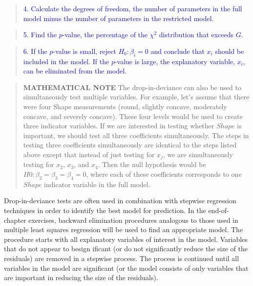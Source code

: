 \documentclass[
]{book}
\begin{document}
\begin{quote}
\textcolor{blue}{4. Calculate the degrees of freedom, the number of parameters in the full model minus the number of parameters in the restricted model.}
\end{quote}

\begin{quote}
\textcolor{blue}{5. Find the $p$-value, the percentage of the $\chi^2$ distribution that exceeds $G$.}
\end{quote}

\begin{quote}
\textcolor{blue}{6. If the $p$-value is small, reject $H_0: \beta_i = 0$ and conclude that $x_i$ should be included in the model. If the $p$-value is large, the explanatory variable, $x_i$, can be eliminated from the model.}
\end{quote}

\begin{quote}
\textbf{MATHEMATICAL NOTE}
The drop-in-deviance can also be used to simultaneously test multiple variables. For example, let's assume that there were four Shape measurements (round, slightly concave, moderately concave, and severely concave). These four levels would be used to create three indicator variables. If we are interested in testing whether \(Shape\) is important, we should test all three coefficients simultaneously. The steps in testing three coefficients simultaneously are identical to the steps listed above except that instead of just testing for \(x_j\), we are simultaneously testing for \(x_2\), \(x_3\), and \(x_4\). Then the null hypothesis would be \(H0: \beta_2 = \beta_3 = \beta_4 = 0\), where each of these coefficients corresponds to one \(Shape\) indicator variable in the full model.
\end{quote}

Drop-in-deviance tests are often used in combination with stepwise regression techniques in order to
identify the best model for prediction. In the end-of-chapter exercises, backward elimination procedures
analogous to those used in multiple least squares regression will be used to find an appropriate model. The procedure starts with all explanatory variables of interest in the model. Variables that do not appear to besign ificant (or do not significantly reduce the size of the residuals) are removed in a stepwise process. The process is continued until all variables in the model are significant (or the model consists of only variables that are important in reducing the size of the residuals).
\end{document}
